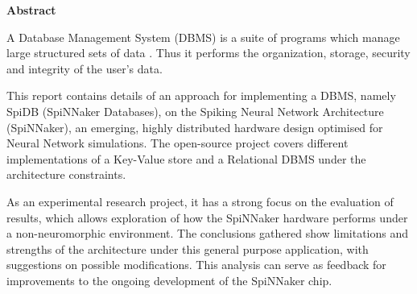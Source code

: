 \vspace*{1.5cm}
{ \huge \bfseries Abstract}
\vspace{7mm}

A Database Management System (DBMS) is a suite of programs which manage large structured sets of data \cite{dbmsdef}. Thus it performs the organization, storage, security and integrity of the user's data.

This report contains details of an approach for implementing a DBMS, namely SpiDB (SpiNNaker Databases), on the Spiking Neural Network Architecture (SpiNNaker), an emerging, highly distributed hardware design optimised for Neural Network simulations. The open-source project covers different implementations of a Key-Value store and a Relational DBMS under the architecture constraints.

As an experimental research project, it has a strong focus on the evaluation of results, which allows exploration of how the SpiNNaker hardware performs under a non-neuromorphic environment. The conclusions gathered show limitations and strengths of the architecture under this general purpose application, with suggestions on possible modifications. This analysis can serve as feedback for improvements to the ongoing development of the SpiNNaker chip.